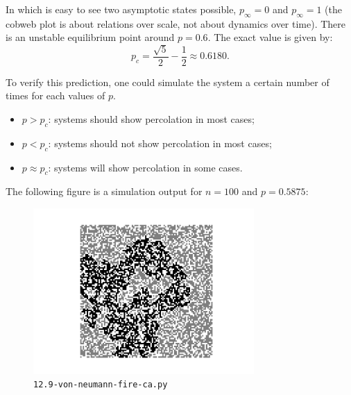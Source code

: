 In which is easy to see two asymptotic states possible, $p_\infty = 0$ and
$p_\infty = 1$ (the cobweb plot is about relations over scale, not about
dynamics over time). There is an unstable equilibrium point around $p = 0.6$.
The exact value is given by:
\begin{equation}
  p_c = \frac{\sqrt{5}}{2} - \frac{1}{2} \approx 0.6180.
\end{equation}

\vspace{5mm}
To verify this prediction, one could simulate the system a certain number of
times for each values of $p$.
\begin{itemize}
  \item $p > p_c$: systems should show percolation in most cases;
  \item $p < p_c$: systems should not show percolation in most cases;
  \item $p \approx p_c$: systems will show percolation in some cases.
\end{itemize}

The following figure is a simulation output for $n = 100$ and $p = 0.5875$:
\begin{figure}[h]
  \centering
  \includegraphics[width=0.75\textwidth]{./figures/12.9-simulation-result.pdf}
  \caption{\texttt{12.9-von-neumann-fire-ca.py}}
\end{figure}
